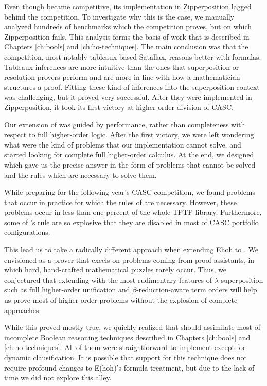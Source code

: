 Even though \lsup{} became competitive, its implementation in Zipperposition
lagged behind the competition. To investigate why this is the case,
we manually analyzed hundreds of benchmarks which the competition proves, but
on which Zipperposition fails. This analysis forms the basis of work that is
described in Chapters \ref{ch:bools} and \ref{ch:ho-techniques}. The main
conclusion was that the competition, most notably tableaux-based Satallax,
reasons better with formulas. Tableaux inferences are more intuitive than the
ones that superposition or resolution provers perform and are more in line with
how a mathematician structures a proof. Fitting these kind of
inferences into the superposition context was challenging, but it proved very
successful. After they were implemented in Zipperposition, it took its first
victory at higher-order division of CASC.

Our extension of \lsup{} was guided by performance, rather than completeness
with respect to full higher-order logic. After the first victory, we were left
wondering what were the kind of problems that our implementation cannot
solve, and started looking for complete full higher-order calculus. At the end,
we designed \osup{} which gave us the precise answer in the form of problems that
cannot be solved and the rules which are necessary to solve them. 

While preparing for the following year's CASC competition, we found problems
that occur in practice for which the rules of \osup{} are necessary. However,
these problems occur in less than one percent of the whole TPTP library.
Furthermore, some of \osup{}'s rule are so explosive that they are disabled in
most of CASC portfolio configurations.

This lead us to take a radically different approach when extending Ehoh to
\ehohii{}. We envisioned \ehohii{} as a prover that excels on problems coming
from proof assistants, in which hard, hand-crafted mathematical puzzles rarely occur.
Thus, we conjectured that extending \lfsup{} with the most rudimentary features
of $\lambda$ superposition such as full higher-order unification and
$\beta$-reduction-aware term orders will help us prove most of higher-order
problems without the explosion of complete approaches.

While this proved mostly true, we quickly realized that \ehohii{} should
assimilate most of incomplete Boolean reasoning techniques described in Chapters
\ref{ch:bools} and \ref{ch:ho-techniques}. All of them were straightforward to
implement except for dynamic clausification. It is possible that support for
this technique does not require profound changes to E(hoh)'s formula treatment,
but due to the lack of time we did not explore this alley.

